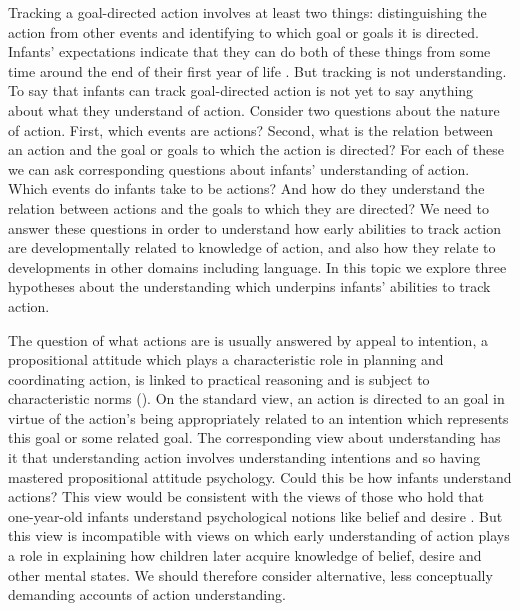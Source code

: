 \documentclass[12pt,\papersize]{extarticle}
\begin{document}
Tracking a goal-directed action involves at least two things: distinguishing the action from other events 
and
identifying to which goal or goals it is directed.
Infants' expectations indicate that they can do both of these things from some time around the end of their first year of life \citep[e.g.][]{Csibra:2003kp}. 
But tracking is not understanding.
To say that infants can track goal-directed action is not yet to say anything about what they understand of action.
Consider two questions about the nature of action.
First, which events are actions?
Second, what is the relation between an action and the goal or goals to which the action is directed?
For each of these we can ask corresponding questions about infants' understanding of action.
Which events do infants take to be actions?
And how do they understand the relation between actions and the goals to which they are directed?
We need to answer these questions in order to understand how early abilities to track action are developmentally related to knowledge of action, and also how they relate to developments in other domains including language.
In this topic we explore three hypotheses about the understanding which underpins infants' abilities to track action.


The question of what actions are is usually answered by appeal to intention, a propositional attitude which plays a characteristic role in planning and coordinating action, is linked to practical reasoning and is subject to characteristic norms (\citealp{Bratman:1987xw}).  
On the standard view, an action is directed to an goal in virtue of the action's being appropriately related to an intention which represents this goal or some related goal.
The corresponding view about understanding has it that 
understanding action involves understanding intentions and so having mastered propositional attitude psychology.
Could this be how infants understand actions?
This view would be consistent with the views of those who hold that one-year-old infants understand psychological notions like belief and desire \citep{Baillargeon:gx}.
But this view is incompatible with  views on which early understanding of action plays a role in explaining how children later acquire knowledge of belief, desire and other mental states.
We should therefore consider alternative, less conceptually demanding accounts of action understanding.
\end{document}
